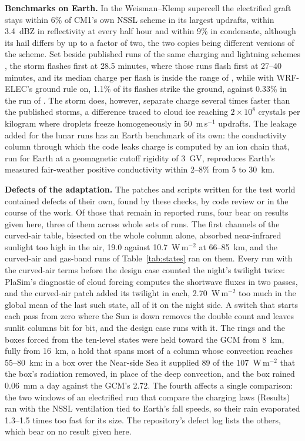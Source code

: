 \textbf{Benchmarks on Earth.} In the Weisman--Klemp supercell \autocite{weisman1982dependence} the electrified
graft stays within 6\% of CM1's own NSSL scheme in its largest updrafts, within 3.4~dBZ in reflectivity at every
half hour and within 9\% in condensate, although its hail differs by up to a factor of two, the two copies being
different versions of the scheme. Set beside published runs of the same charging and lightning schemes
\autocite{macgorman2001lightning,kuhlman2006numerically,sun2023aerosol,salinas2021modeling}, the storm flashes
first at 28.5 minutes, where those runs flash first at 27--40 minutes, and its median charge per flash is inside the range of \textcite{macgorman2001lightning}, while with WRF-ELEC's ground rule on, 1.1\% of its flashes strike the ground,
against 0.33\% in the run of \textcite{salinas2021modeling}. The storm does, however, separate charge several times
faster than the published storms, a difference traced to cloud ice reaching $2\times10^8$ crystals per kilogram
where droplets freeze homogeneously in 50~m\,s$^{-1}$ updrafts. The leakage added for the lunar runs has
an Earth benchmark of its own: the conductivity column through which the code leaks charge is computed by an ion chain
that, run for Earth at a geomagnetic cutoff rigidity of 3~GV, reproduces Earth's measured fair-weather positive
conductivity \autocite{nicoll2012measurements} within 2--8\% from 5 to 30~km.

\textbf{Defects of the adaptation.} The patches and scripts written for the test world contained defects of
their own, found by these checks, by code review or in the course of the work. Of those that remain in reported
runs, four bear on results given here, three of them across whole sets of runs. The first channels of the curved-air table, bisected on the whole column alone, absorbed near-infrared sunlight too high in the air, 19.0 against 10.7~W\,m$^{-2}$ at 66--85~km, and the curved-air and gas-band runs
of Table~\ref{tab:states} ran on them. Every run with the curved-air terms before the design case counted the night's
twilight twice: PlaSim's diagnostic of cloud forcing computes the shortwave fluxes in two passes, and the curved-air
patch added its twilight in each, 2.70~W\,m$^{-2}$ too much in the global mean of the last such state, all of it on
the night side. A switch that starts each pass from zero where the Sun is down removes the double count and leaves
sunlit columns bit for bit, and the design case runs with it. The rings and the boxes forced from the ten-level states were held toward the GCM from
8~km, fully from 16~km, a hold that spans most of a column whose convection reaches 55--80~km: in a box over the
Near-side Sea it supplied 89 of the 107~W\,m$^{-2}$ that the box's radiation removed, in place of the deep
convection, and the box rained 0.06~mm a day against the GCM's 2.72. The fourth affects a single comparison: the two windows of an electrified run that compare the charging laws
(Results) ran with the NSSL
ventilation tied to Earth's fall speeds, so their rain evaporated 1.3--1.5 times too fast for its
size. The repository's defect log lists the others, which bear on no result given here.

